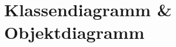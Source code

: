 \documentclass{article}
\begin{document}
\begin{enumerate}[label=\alph*.]
    \end{enumerate}
    
    \newpage
    \section{Klassendiagramm \& Objektdiagramm}
\end{document}
